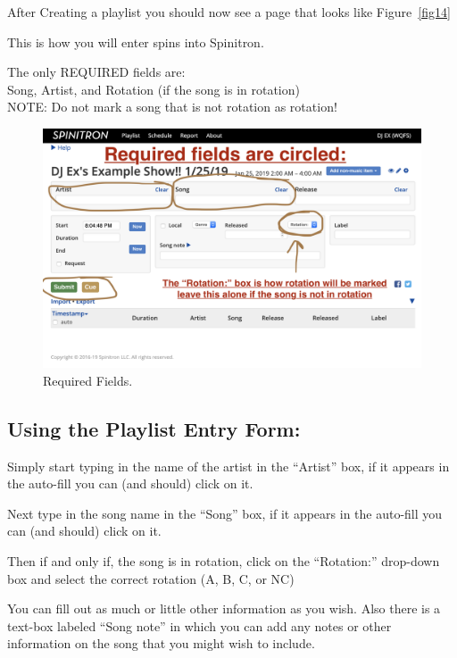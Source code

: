 \documentclass[12pt]{article}
\begin{document}
After Creating a playlist you should now see a page that looks like Figure~\ref{fig14}

This is how you will enter spins into Spinitron. 

The only REQUIRED fields are: 
\\
Song, Artist, and Rotation (if the song is in rotation)
\\
NOTE: Do not mark a song that is not rotation as rotation!

\vspace{1cm}

\begin{figure}[h]
    \centering
    \includegraphics[width=1\textwidth]{images/Playlist_entry_form_marked1.png}
    \caption{Required Fields.}
    \label{fig15}
\end{figure}

\clearpage

\subsection{Using the Playlist Entry Form:}

Simply start typing in the name of the artist in the ``Artist'' box,
if it appears in the auto-fill you can (and should) click on it.

Next type in the song name in the ``Song'' box,
if it appears in the auto-fill you can (and should) click on it.

Then if and only if, the song is in rotation, click on the ``Rotation:'' drop-down box and select the correct rotation (A, B, C, or NC)

You can fill out as much or little other information as you wish. Also there is a text-box labeled ``Song note'' in which you can add any notes or other information on the song that you might wish to include.
\end{document}
